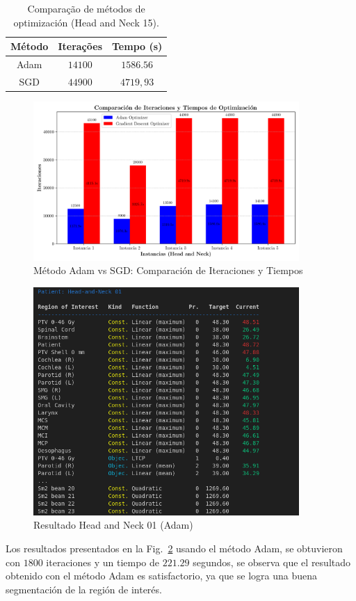 \documentclass[a4paper,12pt]{article}
\begin{document}
\vspace{-1cm}
\begin{table}[!ht]
    \centering
    \caption{Comparação de métodos de optimización (Head and Neck 15).}
    \vspace{0.5cm}
    \label{tab:exemplo}
    \begin{tabular}{ccc}
        \hline
        Método & Iterações & Tempo (s) \\
        \hline
        Adam & $14100$ &  $1586.56$ \\
        SGD & $44900$ & $4719,93$ \\
        \hline
    \end{tabular}
\end{table}

\begin{figure}[!ht]
    \centering
    \includegraphics[width=0.9\textwidth]{../Graficos/comparacion_metodos.png}
    \caption{Método Adam vs SGD: Comparación de Iteraciones y Tiempos}
    \label{fig:exemplo}
  \end{figure}

  \begin{figure}[!ht]
    \centering
    \includegraphics[width=0.9\textwidth]{result_adam01.png}
    \caption{Resultado Head and Neck 01 (Adam)}
    \label{fig:result_adam}
  \end{figure}
Los resultados presentados en la Fig.~\ref{fig:result_adam} usando el método Adam, se obtuvieron con $1800$ iteraciones y un tiempo de $221.29 $ segundos, se observa que el resultado obtenido con el método Adam es satisfactorio, ya que se logra una buena segmentación de la región de interés.
\end{document}
